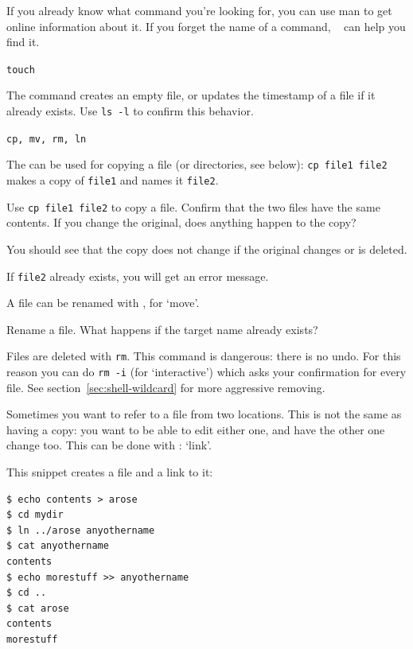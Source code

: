 \begin{remark}
  If you already know what command you're looking for, you can use man
  to get online information about it. If you forget the name of a
  command, ~ can help you find it.
\end{remark}

 {\texttt{touch}}

The  command creates an empty file, or updates the timestamp of
a file if it already exists. Use \lstinline{ls -l} to confirm this behavior.

 {\texttt{cp, mv, rm, ln}}

The  can be used for copying a file (or directories,
see below): \lstinline{cp file1 file2} makes a copy of \lstinline{file1} and names it
\lstinline{file2}.

\begin{exercise}
  Use \lstinline{cp file1 file2} to copy a file. Confirm that the two files
  have the same contents. If you change the original, does anything
  happen to the copy?
\end{exercise}
\begin{outcome}
  You should see that the copy does not change if the original changes
  or is deleted.
\end{outcome}
\begin{caution}
  If \lstinline{file2} already exists, you
  will get an error message.
\end{caution}

A file can be renamed with , for `move'.

\begin{exercise}
  Rename a file. What happens if the target name already exists?
\end{exercise}


Files are deleted with \lstinline{rm}. This command is dangerous: there is no
undo.
For this reason you can do \lstinline{rm -i} (for `interactive') which
asks your confirmation for every file.
See section~\ref{sec:shell-wildcard} for more aggressive removing.

Sometimes you want to refer to a file from two locations.
This is not the same as having a copy: you want to be able
to edit either one, and have the other one change too.
This can be done with : `link'.

This snippet creates a file and a link to it:
\begin{lstlisting}
$ echo contents > arose
$ cd mydir
$ ln ../arose anyothername
$ cat anyothername
contents
$ echo morestuff >> anyothername
$ cd ..
$ cat arose
contents
morestuff
\end{lstlisting}

